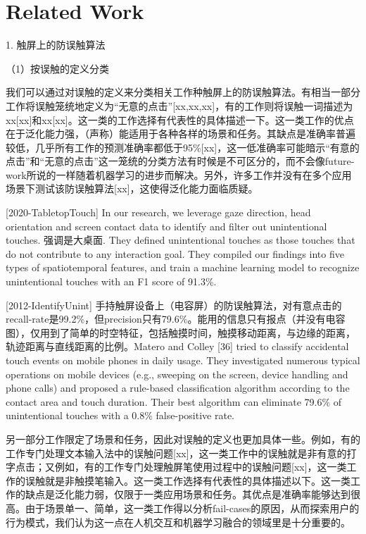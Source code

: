 \section{Related Work}

1. 触屏上的防误触算法

（1）按误触的定义分类

我们可以通过对误触的定义来分类相关工作种触屏上的防误触算法。有相当一部分工作将误触笼统地定义为“无意的点击”[xx,xx,xx]，有的工作则将误触一词描述为xx[xx]和xx[xx]。这一类的工作选择有代表性的具体描述一下。这一类工作的优点在于泛化能力强，（声称）能适用于各种各样的场景和任务。其缺点是准确率普遍较低，几乎所有工作的预测准确率都低于95\%[xx]，这一低准确率可能暗示“有意的点击”和“无意的点击”这一笼统的分类方法有时候是不可区分的，而不会像future-work所说的一样随着机器学习的进步而解决。另外，许多工作并没有在多个应用场景下测试该防误触算法[xx]，这使得泛化能力面临质疑。

[2020-TabletopTouch]
In our research, we leverage gaze direction, head orientation and screen contact data to identify and filter out unintentional touches. 强调是大桌面. They defined unintentional touches as those touches that do not contribute to any interaction goal. They compiled our findings into five types of spatiotemporal features, and train a machine learning model to recognize unintentional touches with an F1 score of 91.3\%.

[2012-IdentifyUnint]
手持触屏设备上（电容屏）的防误触算法，对有意点击的recall-rate是99.2\%，但precision只有79.6\%。能用的信息只有报点（并没有电容图），仅用到了简单的时空特征，包括触摸时间，触摸移动距离，与边缘的距离，轨迹距离与直线距离的比例。Matero and Colley [36] tried to classify accidental touch events on mobile phones in daily usage. They investigated numerous typical operations on mobile devices (e.g., sweeping on the screen, device handling and phone calls) and proposed a rule-based classification algorithm according to the contact area and touch duration. Their best algorithm can eliminate 79.6\% of unintentional touches with a 0.8\% false-positive rate.

另一部分工作限定了场景和任务，因此对误触的定义也更加具体一些。例如，有的工作专门处理文本输入法中的误触问题[xx]，这一类工作中的误触就是非有意的打字点击；又例如，有的工作专门处理触屏笔使用过程中的误触问题[xx]\cite{2014-PalmRejection}，这一类工作的误触就是非触摸笔输入。这一类工作选择有代表性的具体描述以下。这一类工作的缺点是泛化能力弱，仅限于一类应用场景和任务。其优点是准确率能够达到很高。由于场景单一、简单，这一类工作得以分析fail-cases的原因，从而探索用户的行为模式，我们认为这一点在人机交互和机器学习融合的领域里是十分重要的。

